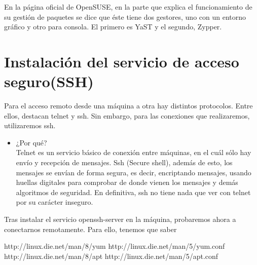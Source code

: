 En la página oficial de OpenSUSE, en la parte que explica el funcionamiento de su gestión de paquetes\cite{c1} se dice que éste tiene dos gestores, uno con un entorno gráfico y otro para consola. El primero es YaST y el segundo, Zypper.

\newpage
\section{Instalación del servicio de acceso seguro(SSH)}
 
 Para el acceso remoto desde una máquina a otra hay distintos protocolos. Entre ellos, destacan telnet y ssh. Sin embargo, para las conexiones que realizaremos, utilizaremos ssh.
 
 \begin{itemize}
 	\item ¿Por qué?\\
 	Telnet es un servicio básico de conexión entre máquinas, en el cuál sólo hay envío y recepción de mensajes. Ssh (Secure shell), además de esto, los mensajes se envían de forma segura, es decir, encriptando mensajes, usando huellas digitales para comprobar de donde vienen los mensajes y demás algoritmos de seguridad. En definitiva, ssh no tiene nada que ver con telnet por su carácter inseguro.
 \end{itemize}
 
 Tras instalar el servicio openssh-server en la máquina, probaremos ahora a conectarnos remotamente. Para ello, tenemos que saber


 


\newpage
\begin{thebibliography}{xx}
	 http://linux.die.net/man/8/yum
	 http://linux.die.net/man/5/yum.conf
	 http://linux.die.net/man/8/apt
	 http://linux.die.net/man/5/apt.conf
	
\end{thebibliography}
